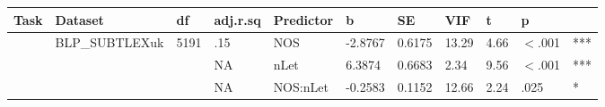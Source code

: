\begin{table}[ht]
\centering
\begingroup\normalsize
\begin{tabular}{lllllllllll}
  \hline
Task & Dataset & df & adj.r.sq & Predictor & b & SE & VIF & t & p &  \\ 
  \hline
 & BLP\_SUBTLEXuk & 5191 & .15 & NOS & -2.8767 & 0.6175 & 13.29 & 4.66 & $<$.001 & *** \\ 
   &  &  & NA & nLet & 6.3874 & 0.6683 & 2.34 & 9.56 & $<$.001 & *** \\ 
   &  &  & NA & NOS:nLet & -0.2583 & 0.1152 & 12.66 & 2.24 & .025 & * \\ 
   \hline
\end{tabular}
\endgroup
\end{table}
